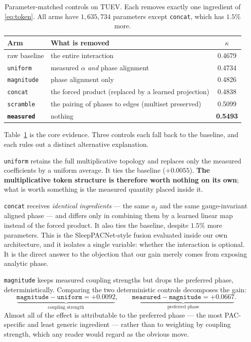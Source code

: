 \documentclass{article}
\begin{document}
\begin{table}[t]
\caption{Parameter-matched controls on TUEV. Each removes exactly one ingredient
of \eqref{eq:token}. All arms have $1{,}635{,}734$ parameters except
\texttt{concat}, which has $1.5\%$ more.}
\label{tab:controls}
\begin{center}
\begin{tabular}{llc}
\toprule
Arm & What is removed & $\kappa$ \\
\midrule
raw baseline & the entire interaction & 0.4679 \\
\texttt{uniform} & measured $\alpha$ \emph{and} phase alignment & 0.4734 \\
\texttt{magnitude} & phase alignment only & 0.4826 \\
\texttt{concat} & the forced product (replaced by a learned projection) & 0.4838 \\
\texttt{scramble} & the pairing of phases to edges (multiset preserved) & 0.5099 \\
\textbf{\texttt{measured}} & nothing & \textbf{0.5493} \\
\bottomrule
\end{tabular}
\end{center}
\end{table}

Table~\ref{tab:controls} is the core evidence. Three controls each fall back to
the baseline, and each rules out a distinct alternative explanation.

\texttt{uniform} retains the full multiplicative topology and replaces only the
measured coefficients by a uniform average. It ties the baseline ($+0.0055$).
\textbf{The multiplicative token structure is therefore worth nothing on its
own}; what is worth something is the measured quantity placed inside it.

\texttt{concat} receives \emph{identical ingredients} --- the same $a_j$ and the
same gauge-invariant aligned phase --- and differs only in combining them by a
learned linear map instead of the forced product. It also ties the baseline,
despite $1.5\%$ more parameters. This is the SleepPACNet-style fusion evaluated
inside our own architecture, and it isolates a single variable: whether the
interaction is optional. It is the direct answer to the objection that our gain
merely comes from exposing analytic phase.

\texttt{magnitude} keeps measured coupling strengths but drops the preferred
phase, deterministically. Comparing the two deterministic controls decomposes the
gain:
\[
\underbrace{\texttt{magnitude} - \texttt{uniform} = +0.0092}_{\text{coupling strength}},
\qquad
\underbrace{\texttt{measured} - \texttt{magnitude} = +0.0667}_{\text{preferred phase}} .
\]
Almost all of the effect is attributable to the preferred phase --- the most
PAC-specific and least generic ingredient --- rather than to weighting by
coupling strength, which any reader would regard as the obvious move.
\end{document}
